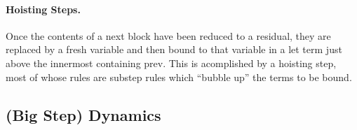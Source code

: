 \paragraph{Hoisting Steps.} 
Once the contents of a next block have been reduced to a residual,
they are replaced by a fresh variable and then bound to that
variable in a let term just above the innermost containing prev.
This is acomplished by a hoisting step,
most of whose rules are substep rules which ``bubble up'' the
terms to be bound.


\subsection{(Big Step) Dynamics}
\label{sec:stagedsemantics}





